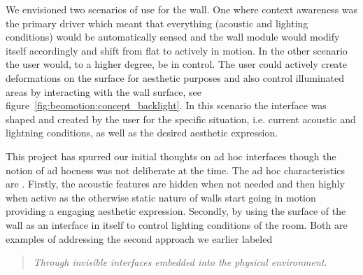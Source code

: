 We envisioned two scenarios of use for the wall.
One where context awareness was the primary driver which meant that everything (acoustic and lighting conditions) would be automatically sensed and the wall module would modify itself accordingly and shift from flat to actively in motion.
In the other scenario the user would, to a higher degree, be in control.
The user could actively create deformations on the surface for aesthetic purposes and also control illuminated areas by interacting with the wall surface, see figure~\ref{fig:beomotion:concept_backlight}.
In this scenario the interface was shaped and created by the user for the specific situation, i.e. current acoustic and lightning conditions, as well as the desired aesthetic expression. 

This project has spurred our initial thoughts on ad hoc interfaces though the notion of ad hocness was not deliberate at the time.
The ad hoc characteristics are .
Firstly, the acoustic features are hidden when not needed and then highly  when active as the otherwise static nature of walls start going in motion providing a engaging aesthetic expression.
Secondly, by using the surface of the wall as an interface in itself to control lighting conditions of the room. 
Both are examples of addressing the second approach we earlier labeled 

\begin{quotation}
	\emph{Through invisible interfaces embedded into the physical environment}.
\end{quotation}

